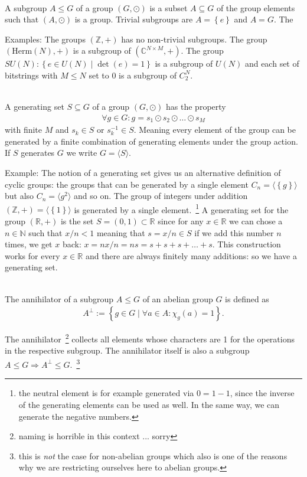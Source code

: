 \begin{def*}[Subgroup]\phantom{...}\\
A subgroup $A\leq G$ of a group $(G,\odot)$ is a subset $A\subseteq G$ of the group elements such that $(A,\odot)$ is a group. Trivial subgroups are $A=\left\{e\right\}$ and $A=G$. The 
\end{def*}
Examples: The groups $(\mathbb{Z}, +)$ has no non-trivial subgroups. The group $(\text{Herm}(N), +)$ is a subgroup of $(\mathbb{C}^{N\times M}, +)$. The group $SU(N): \left\{e\in U(N)\;|\; \det(e)=1\right\}$ is a subgroup of $U(N)$ and each set of bitstrings with $M\leq N$ set to $0$ is a subgroup of $C_2^N$.\
\begin{def*}[Generating Set]\phantom{...}\\
A generating set $S\subseteq G$ of a group $(G,\odot)$ has the property
\begin{align*}
    \forall g\in G:  g=s_1\odot s_2\odot \dots \odot s_M
\end{align*}
with finite $M$ and $s_k\in S$ or $s_k^{-1}\in S$.
Meaning every element of the group can be generated by a finite combination of generating elements under the group action. If $S$ generates $G$ we write $G = \langle S\rangle $.
\end{def*}
Example: The notion of a generating set gives us an alternative definition of cyclic groups: the groups that can be generated by a single element $C_n = \langle \left\{g\right\}\rangle $ but also $C_n = \langle g^2\rangle$ and so on. The group of integers under addition  $(\mathbb{Z}, +)=\langle \left\{1\right\}\rangle $ is generated by a single element.~\footnote{the neutral element is for example generated via $0=1-1$, since the inverse of the generating elements can be used as well. In the same way, we can generate the negative numbers.} A generating set for the group $(\mathbb{R}, +)$ is the set $S=(0,1)\subset \mathbb{R}$ since for any  $x\in \mathbb{R}$ we can chose a $n\in \mathbb{N}$ such that $x/n<1$ meaning that $s=x/n\in S$ if we add this number $n$ times, we get $x$ back: $x=nx/n=ns=s+s+s+\dots +s$. This construction works for every $x\in \mathbb{R}$ and there are always finitely many additions: so we have a generating set.
\begin{def*}[Annihilator]\phantom{...}\\
The annihilator of a subgroup $A\leq G$ of an abelian group $G$ is defined as
\begin{align}
    A^\perp := \left\{g\in G \mid \forall a\in A :\chi_g(a)=1\right\}.
\end{align}    
\end{def*}
The annihilator~\footnote{naming is horrible in this context ... sorry} collects all elements whose characters are 1 for the operations in the respective subgroup. The annihilator itself is also a subgroup $A\leq G \Rightarrow A^\perp \leq G$.~\footnote{this is \textit{not} the case for non-abelian groups which also is one of the reasons why we are restricting ourselves here to abelian groups.}

